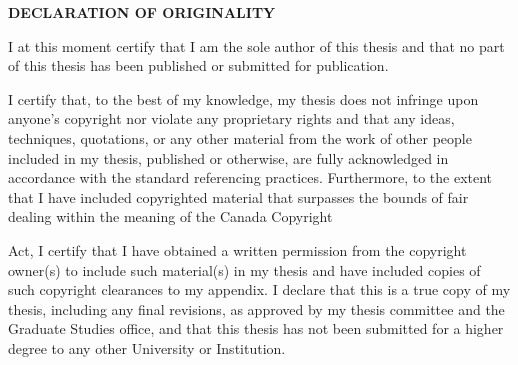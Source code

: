 \newpage
{}
{
	\centering
	\fontsize{17.5}{0}
	\textbf{DECLARATION OF ORIGINALITY}
\par}

\par I at this moment certify that I am the sole author of this thesis and that no part of this thesis has been published or submitted for publication.\newline
\par I certify that, to the best of my knowledge, my thesis does not infringe upon anyone's copyright nor violate any proprietary rights and that any ideas, techniques, quotations, or any other material from the work of other people included in my thesis, published or otherwise, are fully acknowledged in accordance with the standard referencing practices. Furthermore, to the extent that I have included copyrighted material that surpasses the bounds of fair dealing within the meaning of the Canada Copyright \par Act, I certify that I have obtained a written permission from the copyright owner(s) to include such material(s) in my thesis and have included copies of such copyright clearances to my appendix.\newline
I declare that this is a true copy of my thesis, including any final revisions, as approved by my thesis committee and the Graduate Studies office, and that this thesis has not been submitted for a higher degree to any other University or Institution.